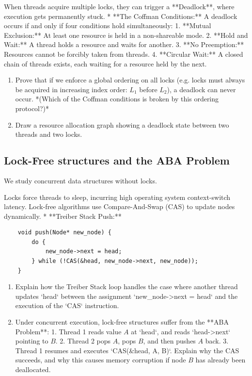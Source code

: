 \documentclass[12pt, a4paper]{book}
\begin{document}
\begin{explobox}
When threads acquire multiple locks, they can trigger a **Deadlock**, where execution gets permanently stuck.
* **The Coffman Conditions:** A deadlock occurs if and only if four conditions hold simultaneously:
  1. **Mutual Exclusion:** At least one resource is held in a non-shareable mode.
  2. **Hold and Wait:** A thread holds a resource and waits for another.
  3. **No Preemption:** Resources cannot be forcibly taken from threads.
  4. **Circular Wait:** A closed chain of threads exists, each waiting for a resource held by the next.
\begin{enumerate}[label=(\alph*), leftmargin=*]
  \item Prove that if we enforce a global ordering on all locks (e.g. locks must always be acquired in increasing index order: $L_1$ before $L_2$), a deadlock can never occur.
        *(Which of the Coffman conditions is broken by this ordering protocol?)*
  \item Draw a resource allocation graph showing a deadlock state between two threads and two locks.
\end{enumerate}
\end{explobox}

\subsection{Lock-Free structures and the ABA Problem}

We study concurrent data structures without locks.

\begin{explobox}
Locks force threads to sleep, incurring high operating system context-switch latency.
Lock-free algorithms use Compare-And-Swap (CAS) to update nodes dynamically.
* **Treiber Stack Push:**
  \begin{verbatim}
    void push(Node* new_node) {
        do {
            new_node->next = head;
        } while (!CAS(&head, new_node->next, new_node));
    }
  \end{verbatim}
\begin{enumerate}[label=(\alph*), leftmargin=*]
  \item Explain how the Treiber Stack loop handles the case where another thread updates `head` between the assignment `new_node->next = head` and the execution of the `CAS` instruction.
  \item Under concurrent execution, lock-free structures suffer from the **ABA Problem**:
        1. Thread 1 reads value $A$ at `head`, and reads `head->next` pointing to $B$.
        2. Thread 2 pops $A$, pops $B$, and then pushes $A$ back.
        3. Thread 1 resumes and executes `CAS(&head, A, B)`.
        Explain why the CAS succeeds, and why this causes memory corruption if node $B$ has already been deallocated.
\end{enumerate}
\end{explobox}
\end{document}
